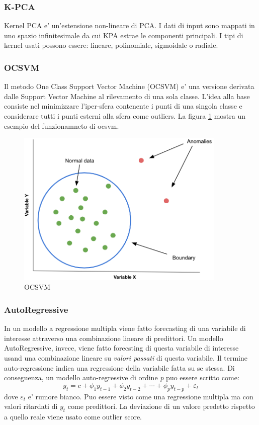 \subsubsection{K-PCA}
Kernel PCA e' un'estensione non-lineare di PCA. I dati di input sono mappati in uno spazio infinitesimale da cui KPA estrae le componenti principali. I tipi di kernel usati possono essere: lineare, polinomiale, sigmoidale o radiale.
\subsubsection{OCSVM}
Il metodo One Class Support Vector Machine (OCSVM) e' una versione derivata dalle Support Vector Machine al rilevamento di una sola classe. L'idea alla base consiste nel minimizzare l'iper-sfera contenente i punti di una singola classe e considerare tutti i punti esterni alla sfera come outliers.
La figura \ref{ocsvm} mostra un esempio del funzionamneto di ocsvm.
\begin{figure}[t]
	\centering
	\includegraphics[width=10cm, scale=1]{images/ocsvm}
	\caption{OCSVM}
	\label{ocsvm}
\end{figure}


\subsubsection{AutoRegressive}
In un modello a regressione multipla viene fatto forecasting di una variabile di interesse attraverso una combinazione lineare di predittori. Un modello AutoRegressive, invece, viene fatto forecsting di questa variabile di interesse usand una combinazione lineare su \textit{valori passati} di questa variabile. Il termine auto-regressione indica una regressione della variabile fatta su se stessa.
Di conseguenza, un modello auto-regressive di ordine \textit{p} puo essere scritto come:
\[y_t=c+\phi_1 y_{t-1}+\phi_2 y_{t-2}+\cdots+\phi_p y_{t-p}+\varepsilon_t\]
dove $\varepsilon_t$ e' rumore bianco. Puo essere visto come una regressione multipla ma con valori ritardati di $y_t$ come predittori. 
La deviazione di un valore predetto rispetto a quello reale viene usato come outlier score.

